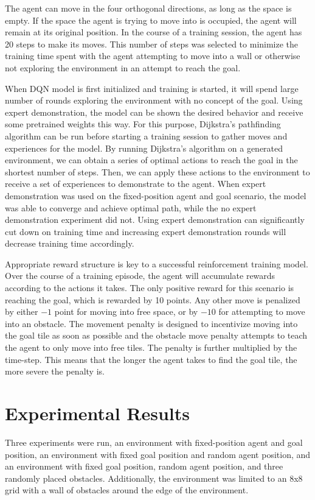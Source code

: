 \documentclass[conference]{IEEEtran}
\begin{document}
The agent can move in the four orthogonal directions, as long as the space is
empty. If the space the agent is trying to move into is occupied, the agent will
remain at its original position. In the course of a training session, the agent
has 20 steps to make its moves. This number of steps was selected to minimize
the training time spent with the agent attempting to move into a wall or
otherwise not exploring the environment in an attempt to reach the goal.

When DQN model is first initialized and training is started, it will spend large
number of rounds exploring the environment with no concept of the goal. Using
expert demonstration, the model can be shown the desired behavior and receive
some pretrained weights this way. For this purpose, Dijkstra's pathfinding
algorithm can be run before starting a training session to gather moves and
experiences for the model. By running Dijkstra's algorithm on a generated
environment, we can obtain a series of optimal actions to reach the goal in the
shortest number of steps. Then, we can apply these actions to the environment to
receive a set of experiences to demonstrate to the agent. When expert
demonstration was used on the fixed-position agent and goal scenario, the model
was able to converge and achieve optimal path, while the no expert demonstration
experiment did not. Using expert demonstration can significantly cut down on
training time and increasing expert demonstration rounds will decrease training
time accordingly.

Appropriate reward structure is key to a successful reinforcement training
model. Over the course of a training episode, the agent will accumulate rewards
according to the actions it takes. The only positive reward for this scenario is
reaching the goal, which is rewarded by 10 points. Any other move is penalized
by either $-1$ point for moving into free space, or by $-10$ for attempting to
move into an obstacle. The movement penalty is designed to incentivize moving
into the goal tile as soon as possible and the obstacle move penalty attempts to
teach the agent to only move into free tiles. The penalty is further multiplied
by the time-step. This means that the longer the agent takes to find the goal
tile, the more severe the penalty is.

\section{Experimental Results}
Three experiments were run, an environment with fixed-position agent and goal
position, an environment with fixed goal position and random agent position, and
an environment with fixed goal position, random agent position, and three
randomly placed obstacles. Additionally, the environment was limited to an 8x8
grid with a wall of obstacles around the edge of the environment.
\end{document}
